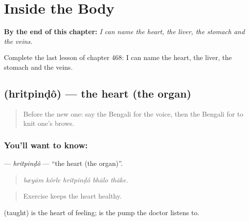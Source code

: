 
\chapter{Inside the Body}
\label{ch:bn-inside-the-body}

\begin{chapteropening}
\textbf{By the end of this chapter:} \emph{I can name the heart, the liver, the stomach and the veins.}

Complete the last lesson of chapter 468: I can name the heart, the liver, the stomach and the veins.
\end{chapteropening}

\section[\texorpdfstring{\bn{হৃৎপিণ্ড} (hritpinḍô)}{হৃৎপিণ্ড (hritpinḍô)}]{ (hritpinḍô) — the heart (the organ)}

\label{lesson:BN-C468-hritpindo}



\begin{quote}
Before the new one: say the Bengali for the voice, then the Bengali for to knit one's brows.
\end{quote}

\subsection*{You'll want to know: }
\textbf{} — \emph{hritpinḍô} — \textquotedblleft{}the heart (the organ)\textquotedblright{}.

\begin{quote}
    
\end{quote}

\begin{quote}
\emph{bæyām kôrle hritpinḍô bhālo thāke.}
\end{quote}

\begin{quote}
Exercise keeps the heart healthy.
\end{quote}

 (taught) is the heart of feeling;  is the pump the doctor listens to.

